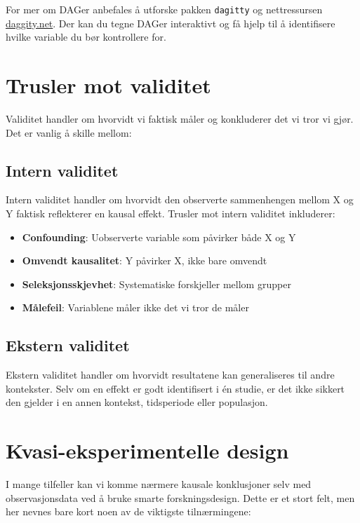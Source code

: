 \documentclass[
  norsk,
  letterpaper,
  DIV=11,
  numbers=noendperiod]{scrreprt}
\providecommand{\tightlist}{%
  \setlength{\itemsep}{0pt}\setlength{\parskip}{0pt}}
\theoremstyle{definition}
\theoremstyle{remark}
\begin{document}
For mer om DAGer anbefales å utforske pakken \texttt{dagitty} og
nettressursen \href{http://www.dagitty.net/}{daggity.net}. Der kan du
tegne DAGer interaktivt og få hjelp til å identifisere hvilke variable
du bør kontrollere for.

\section{Trusler mot validitet}\label{trusler-mot-validitet}

Validitet handler om hvorvidt vi faktisk måler og konkluderer det vi
tror vi gjør. Det er vanlig å skille mellom:

\subsection{Intern validitet}\label{intern-validitet}

Intern validitet handler om hvorvidt den observerte sammenhengen mellom
X og Y faktisk reflekterer en kausal effekt. Trusler mot intern
validitet inkluderer:

\begin{itemize}
\tightlist
\item
  \textbf{Confounding}: Uobserverte variable som påvirker både X og Y
\item
  \textbf{Omvendt kausalitet}: Y påvirker X, ikke bare omvendt
\item
  \textbf{Seleksjonsskjevhet}: Systematiske forskjeller mellom grupper
\item
  \textbf{Målefeil}: Variablene måler ikke det vi tror de måler
\end{itemize}

\subsection{Ekstern validitet}\label{ekstern-validitet}

Ekstern validitet handler om hvorvidt resultatene kan generaliseres til
andre kontekster. Selv om en effekt er godt identifisert i én studie, er
det ikke sikkert den gjelder i en annen kontekst, tidsperiode eller
populasjon.

\section{Kvasi-eksperimentelle
design}\label{kvasi-eksperimentelle-design}

I mange tilfeller kan vi komme nærmere kausale konklusjoner selv med
observasjonsdata ved å bruke smarte forskningsdesign. Dette er et stort
felt, men her nevnes bare kort noen av de viktigste tilnærmingene:
\end{document}
